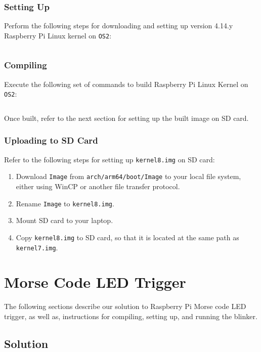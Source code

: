\documentclass[onecolumn, oneside, letterpaper, draftclsnofoot, 10pt]{IEEEtran}
\begin{document}
\subsubsection{Setting Up}
Perform the following steps for downloading and setting up version 4.14.y Raspberry Pi Linux kernel on \texttt{OS2}:
\inputminted[breaklines]{bash}{cs1.sh}

\subsubsection{Compiling}
Execute the following set of commands to build Raspberry Pi Linux Kernel on \texttt{OS2}:
\inputminted[breaklines]{bash}{cs3.sh}
Once built, refer to the next section for setting up the built image on SD card.

\subsubsection{Uploading to SD Card} \label{ker_upload}
Refer to the following steps for setting up \texttt{kernel8.img} on SD card:
\begin{enumerate}
\item Download \texttt{Image} from \texttt{arch/arm64/boot/Image} to your local file system, either using WinCP or another file transfer protocol.
\item Rename \texttt{Image} to \texttt{kernel8.img}.
\item Mount SD card to your laptop.
\item Copy \texttt{kernel8.img} to SD card, so that it is located at the same path as \texttt{kernel7.img}.
\end{enumerate}


\section{Morse Code LED Trigger}
The following sections describe our solution to Raspberry Pi Morse code LED trigger, as well as, instructions for compiling, setting up, and running the blinker.

\subsection{Solution}
\end{document}
